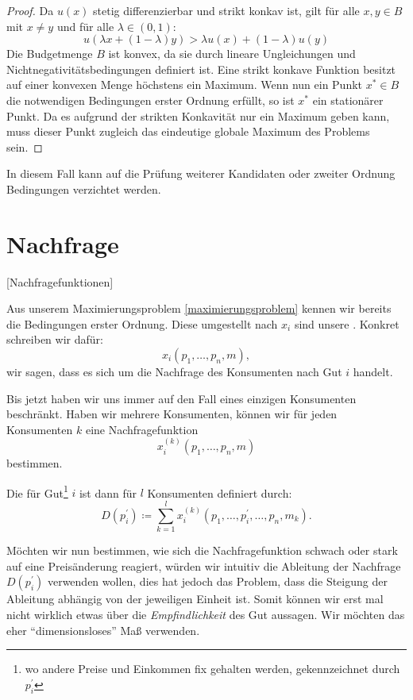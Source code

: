 \begin{proof}
	Da \( u(x) \) stetig differenzierbar und strikt konkav ist, gilt für alle \( x, y \in B \) mit \( x \neq y \) und für alle \( \lambda \in (0,1) \):
	\[
		u(\lambda x + (1-\lambda) y) > \lambda u(x) + (1-\lambda) u(y)
	\]
	Die Budgetmenge \( B \) ist konvex, da sie durch lineare Ungleichungen und Nichtnegativitätsbedingungen definiert ist.
	Eine strikt konkave Funktion besitzt auf einer konvexen Menge höchstens ein Maximum.
	Wenn nun ein Punkt \( x^* \in B \) die notwendigen Bedingungen erster Ordnung erfüllt, so ist \( x^* \) ein stationärer Punkt. Da es aufgrund der strikten Konkavität nur ein Maximum geben kann, muss dieser Punkt zugleich das eindeutige globale Maximum des Problems sein.
\end{proof}

In diesem Fall kann auf die Prüfung weiterer Kandidaten oder zweiter Ordnung Bedingungen verzichtet werden.



\section{Nachfrage}
\label{sec:nachfrage}
[Nachfragefunktionen]
\begin{notation}
	Aus unserem Maximierungsproblem \ref{maximierungsproblem} kennen wir bereits die  Bedingungen erster Ordnung. Diese umgestellt nach $x_i$ sind unsere .
	Konkret schreiben wir dafür:
	\[
		x_i(p_1,\dotsc,p_n,m)
		,\]
	wir sagen, dass es sich um die Nachfrage des Konsumenten nach Gut $i$ handelt.
\end{notation}
Bis jetzt haben wir uns immer auf den Fall eines einzigen Konsumenten beschränkt. Haben wir mehrere Konsumenten, können wir für jeden Konsumenten $k$ eine Nachfragefunktion
\[
	x_i^{(k)} (p_1,\dotsc,p_n,m)
\]
bestimmen.
\begin{definition}  
	Die  für Gut\footnote{wo andere Preise und
	Einkommen fix gehalten werden, gekennzeichnet durch $p_i^{\prime}$ } $i$ ist dann für $l$ Konsumenten definiert durch:
	\[
		D\left(p_i^{\prime}\right) \coloneqq \sum_{k=1}^{l} x_{i}^{(k)}(p_1,\dotsc,p_i^{\prime}, \dotsc, p_n,m_k)
		.\]
\end{definition}

Möchten wir nun bestimmen, wie sich die Nachfragefunktion schwach oder stark auf eine Preisänderung reagiert, würden wir intuitiv die Ableitung der Nachfrage $D(p_i^{\prime})$ verwenden wollen, dies hat jedoch das Problem, dass die Steigung der Ableitung abhängig von der jeweiligen Einheit ist.
Somit können wir erst mal nicht wirklich etwas über die \emph{Empfindlichkeit} des Gut aussagen.
Wir möchten das eher \enquote{dimensionsloses} Maß verwenden.

